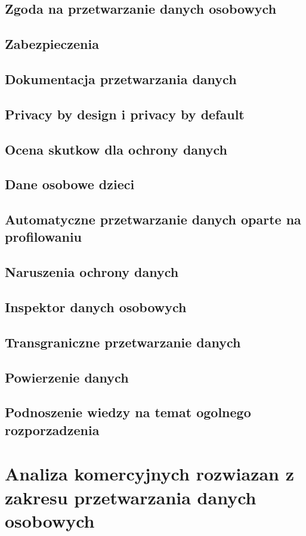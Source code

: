 \documentclass[en, noamssymb]{mgr}
\begin{document}
\section{Zgoda na przetwarzanie danych osobowych}
\section{Zabezpieczenia}
\section{Dokumentacja przetwarzania danych}
\section{Privacy by design i privacy by default}
\section{Ocena skutkow dla ochrony danych}
\section{Dane osobowe dzieci}
\section{Automatyczne przetwarzanie danych oparte na profilowaniu}
\section{Naruszenia ochrony danych}
\section{Inspektor danych osobowych}
\section{Transgraniczne przetwarzanie danych}
\section{Powierzenie danych}
\section{Podnoszenie wiedzy na temat ogolnego rozporzadzenia}

\chapter{Analiza komercyjnych rozwiazan z zakresu przetwarzania danych osobowych} \label{sec:sekcjaAnalizaRozwiazan}
\end{document}
